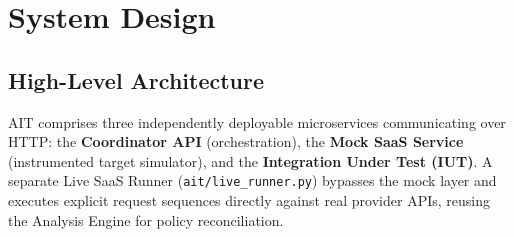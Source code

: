 \documentclass[12pt,a4paper]{report}
\begin{document}
\chapter{System Design}
\label{ch:design}

\section{High-Level Architecture}

AIT comprises three independently deployable microservices communicating over HTTP: the
\textbf{Coordinator API} (orchestration), the \textbf{Mock SaaS Service} (instrumented target
simulator), and the \textbf{Integration Under Test (IUT)}. A separate Live SaaS Runner
(\texttt{ait/live\_runner.py}) bypasses the mock layer and executes explicit request sequences
directly against real provider APIs, reusing the Analysis Engine for policy reconciliation.
\end{document}
